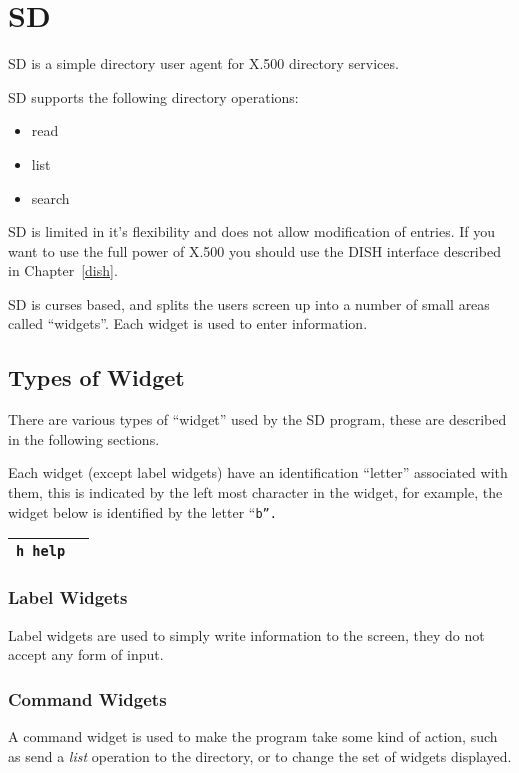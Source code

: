 
\chapter {SD}
\label{sd}

SD is a simple directory user agent for X.500 directory services.

SD supports the following directory operations:
\begin{itemize}
\item read
\item list
\item search
\end{itemize}

SD is limited in it's flexibility and does not allow modification of entries.
If you want to use the full power of X.500 you should use the DISH interface 
described in Chapter~\ref{dish}.

SD is curses based, and splits the users screen up into a number of
small areas called ``widgets''.  Each widget is used to enter information.

\section {Types of Widget}

There are various types of ``widget'' used by the SD program, these are
described in the following sections.

Each widget (except label widgets) have an identification
``letter'' associated with them,
this is indicated by the left most character in the widget, for example,
the widget below is identified by the letter ``\tt b\rm ''.

\begin{tabular}{|l|}
\hline
\tt h help\ \ \\
\hline
\end{tabular}

\subsection {Label Widgets}
Label widgets are used to simply write information to the screen, they do not 
accept any form of input.

\subsection {Command Widgets}
A command widget is used to make the program take some kind of action, such as
send a {\em list} operation to the directory,
or to change the set of widgets displayed.
  
